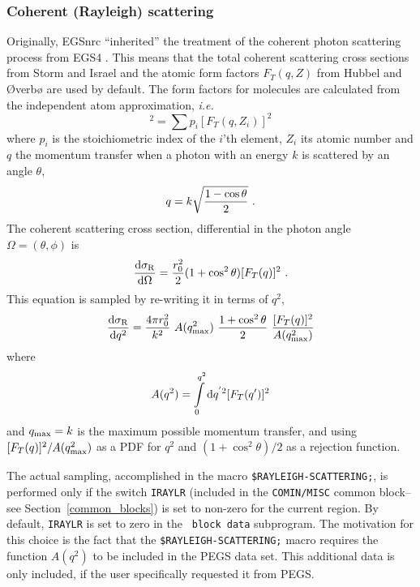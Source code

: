 \subsubsection{Coherent (Rayleigh) scattering}
\label{rayleigh}
\setcounter{equation}{0}

Originally, EGSnrc ``inherited'' the treatment of the coherent
photon scattering process from EGS4 \cite{Ne85}.
This means that the total coherent scattering cross
sections from Storm and Israel \cite{SI70} and the atomic
form factors $F_T(q,Z)$ from Hubbel and {\O}verb{\o} \cite{HO79} are used
by default.
The form factors for molecules are calculated from the independent
atom approximation, {\em i.e.}
\begin{equation}
[F_T(q)]^2 = \sum p_i [F_T(q,Z_i)]^2
\end{equation}
where $p_i$ is the stoichiometric index of the $i$'th element,
$Z_i$ its atomic number and $q$ the momentum transfer when
a photon with an energy $k$ is scattered by an angle $\theta$,
\begin{equation}
q = k \sqrt{{1 - \cos \theta \over 2}}~.
\end{equation}
The coherent scattering cross section, differential in the
photon angle $\Omega = (\theta, \phi)$ is
\begin{equation}
{{\rm d} \sigma_{\rm R} \over {\rm d} \Omega} = {r_0^2 \over 2}
(1 + \cos^2 \theta) [F_T(q)]^2~.
\end{equation}
This equation is sampled by re-writing it in terms of
$q^2$,
\begin{equation}
{{\rm d} \sigma_{\rm R} \over {\rm d} q^2} = {4 \pi r_0^2 \over k^2}~
A(q_{\rm max}^2)~
{1 + \cos^2 \theta \over 2} ~{[F_T(q)]^2 \over A(q_{\rm max}^2)
}
\end{equation}
where
\begin{equation}
A(q^2) = \int\limits_0^{q^2} {\rm d}q^{'2} [F_T(q')]^2
\end{equation}
and $q_{\rm max} = k$ is the maximum possible momentum transfer, and
using $[F_T(q)]^2/A(q_{\rm max}^2)$  as a PDF for $q^2$ and
$(1 + \cos^2 \theta)/2$ as a rejection function.

  
The actual sampling, accomplished in the macro
{\tt \$RAYLEIGH-SCATTERING;}, is performed only
if the switch {\tt IRAYLR} (included
in the {\tt COMIN/MISC} common block--see Section~\ref{common_blocks})
is set to non-zero for the current
region. By default, {\tt IRAYLR} is set to zero in the {\tt
block data} subprogram. The motivation for this choice is
the fact that the {\tt \$RAYLEIGH-SCATTERING;} macro
requires the function $A(q^2)$ to be included in the PEGS data
set. This additional data is only included, if the user specifically
requested it from PEGS.

